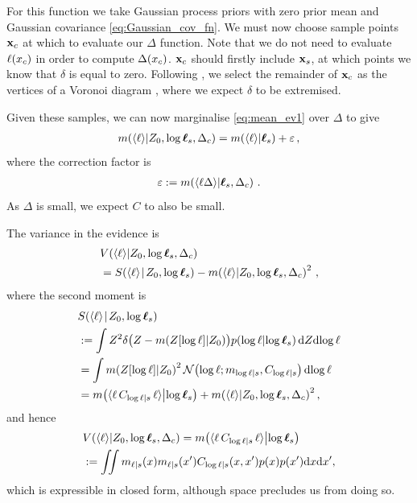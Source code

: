 \documentclass{article}
\begin{document}
For this function we take Gaussian process priors with zero prior mean and Gaussian covariance \eqref{eq:Gaussian_cov_fn}. We must now choose sample points $\vlfv_c$ at which to evaluate our $\Delta$ function. 
Note that we do not need to evaluate $\lfn(\lfv_c)$ in order to compute $\Delta(\lfv_c)$.
$\vlfv_c$ should firstly include $\vlfv_s$, at which points we know that $\delta$ is equal to zero. Following \cite{BQR}, we select the remainder of $\vlfv_c$  as the  vertices of a Voronoi diagram \citep{okabe1997locational}, where we expect $\delta$ to be extremised. 

Given these samples, we can now marginalise \eqref{eq:mean_ev1} over $\Delta$ to give
\begin{align}
 \mean{\inty{\lfn}}{Z_0,\tvr_s,\Delta_c} =
\mean{\inty{\lfn}}{\vr_s} + \corrn \,,
\label{eq:mean_ev2}
\end{align}
where the correction factor is
\begin{align*}
 \corrn \deq \mean{\inty{\lfn \Delta}}{\vr_s, \Delta_c}\,.
\end{align*}
As $\Delta$ is small, we expect $C$ to also be small. 

The variance in the evidence is
\begin{align*}
& \cov{\inty{\lfn}}{Z_0,\tvr_s,\Delta_c}\\ 
& = \secm{\inty{\lfn}}{Z_0,\tvr_s} - \mean{\inty{\lfn}}{Z_0,\tvr_s,\Delta_c}^2\,,
\end{align*}
where the second moment is 
\begin{align*}
& \secm{\inty{\lfn}}{Z_0,\tvr_s}  \\
& \deq \int Z^2 
\delta\bigl(Z - \mean{Z[\tr]}{Z_0}\bigr)
\p{\tr}{\tvr_s}
\ud Z \ud\tr\\
& = \int \mean{Z[\tr]}{Z_0}^2
\N{\tr}{\meancondfn{\tr}{s}}{C_{\tr|s}}
 \ud\tr\\
& = \mean{\inty{\lfn\,C_{\tr|s}\,\lfn}}{\tvr_s}+
\mean{\inty{\lfn}}{Z_0,\tvr_s,\Delta_c}^2,
\end{align*}
and hence 
\begin{align*}
  &\cov{\inty{\lfn}}{Z_0,\tvr_s,\Delta_c} = \mean{\inty{\lfn\,C_{\tr|s}\,\lfn}}{\tvr_s} \\ 
& \deq
 \iint m_{\lfn|s}(\lfv) m_{\lfn|s}(\lfv') C_{\tr|s}(\lfv,\lfv')  p(x) p(x') \ud \lfv \ud\lfv',
\end{align*}
which is expressible in closed form, although space precludes us from doing so.
\end{document}
